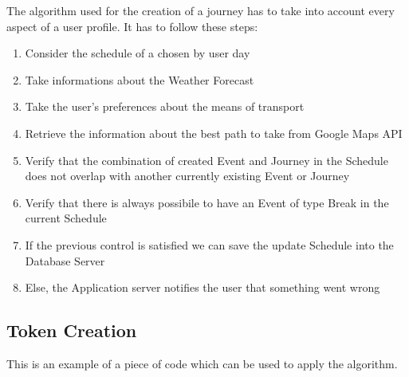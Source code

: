 \documentclass[numbers=noenddot, 12pt, a4paper, oneside]{scrbook}
\begin{document}
The algorithm used for the creation of a journey has to take into account every aspect of a user profile. It has to follow these steps:\\
\begin{enumerate}
	\item Consider the schedule of a chosen by user day
	\item Take informations about the Weather Forecast
	\item Take the user's preferences about the means of transport
	\item Retrieve the information about the best path to take from Google Maps API 
	\item Verify that the combination of created Event and Journey in the Schedule does not overlap with another currently existing Event or Journey
	\item Verify that there is always possibile to have an Event of type Break in the current Schedule
	\item If the previous control is satisfied we can save the update Schedule into the Database Server
	\item Else, the Application server notifies the user that something went wrong
\end{enumerate}


\subsection*{Token Creation}

This is an example of a piece of code which can be used to apply the algorithm.
\end{document}
